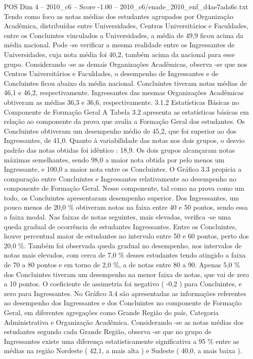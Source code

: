 \begin{textsample}{POS Dim 4 – 2010\_c6 – Score -1.00 – 2010\_c6/enade\_2010\_enf\_d4ae7ada6c.txt}
Tendo como foco as notas médias dos estudantes agrupados por Organização Acadêmica, distribuídas entre Universidades, Centros Universitários e Faculdades, entre os Concluintes vinculados a Universidades, a média de 49,9 ficou acima da média nacional.
Pode -se verificar a mesma realidade entre os Ingressantes de Universidades, cuja nota média foi 40,2, também acima da nacional para esse grupo.
Considerando -se as demais Organizações Acadêmicas, observa -se que nos Centros Universitários e Faculdades, o desempenho de Ingressantes e de Concluintes ficou abaixo da média nacional.
Concluintes tiveram notas médias de 46,1 e 46,2, respectivamente.
Ingressantes das mesmas Organizações Acadêmicas obtiveram as médias 36,3 e 36,6, respectivamente. 3.1.2 Estatísticas Básicas no Componente de Formação Geral A Tabela 3.2 apresenta as estatísticas básicas em relação ao componente da prova que avalia a Formação Geral dos estudantes.
Os Concluintes obtiveram um desempenho médio de 45,2, que foi superior ao dos Ingressantes, de 41,0.
Quanto à variabilidade das notas nos dois grupos, o desvio padrão das notas obtidas foi idêntico : 18,9.
Os dois grupos alcançaram notas máximas semelhantes, sendo 98,0 a maior nota obtida por pelo menos um Ingressante, e 100,0 a maior nota entre os Concluintes.
O Gráfico 3.3 propicia a comparação entre Concluintes e Ingressantes relativamente ao desempenho no componente de Formação Geral.
Nesse componente, tal como na prova como um todo, os Concluintes apresentaram desempenho superior.
Dos Ingressantes, um pouco menos de 20,0 \% obtiveram notas na faixa entre 40 e 50 pontos, sendo essa a faixa modal.
Nas faixas de notas seguintes, mais elevadas, verifica -se uma queda gradual de ocorrência de estudantes Ingressantes.
Entre os Concluintes, houve percentual maior de estudantes no intervalo entre 50 e 60 pontos, perto dos 20,0 \%.
Também foi observada queda gradual no desempenho, nos intervalos de notas mais elevados, com cerca de 7,0 \% desses estudantes tendo atingido a faixa de 70 a 80 pontos e em torno de 2,0 \%, a de notas entre 80 a 90.
Apenas 5,0 \% dos Concluintes tiveram um desempenho na menor faixa de notas, que vai de zero a 10 pontos.
O coeficiente de assimetria foi negativo ( -0,2 ) para Concluintes, e zero para Ingressantes.
No Gráfico 3.4 são apresentadas as informações referentes ao desempenho dos Ingressantes e dos Concluintes no componente de Formação Geral, em diferentes agregações como Grande Região do país, Categoria Administrativa e Organização Acadêmica.
Considerando -se as notas médias dos estudantes segundo cada Grande Região, observa -se que no grupo de Ingressantes existe uma diferença estatisticamente significativa a 95 \% entre as médias na região Nordeste ( 42,1, a mais alta ) e Sudeste ( 40,0, a mais baixa ).

\end{textsample}
